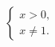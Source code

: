 \documentclass[preview]{standalone}
\begin{document}
\begin{align*}
\begin{cases} x > 0, \\ x \neq 1. \end{cases}
\end{align*}
\end{document}
